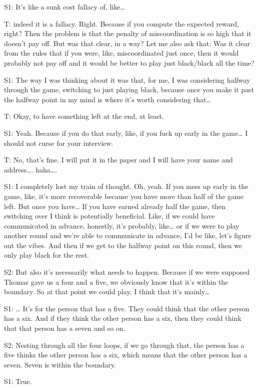 \documentclass[a4paper,superscriptaddress,nofootinbib]{revtex4}
\begin{document}
S1: It's like a sunk cost fallacy of, like… 

T: indeed it is a fallacy. Right. Because if you compute the expected reward, right? Then the problem is that the penalty of miscoordination is so high that it doesn't pay off. But was that clear, in a way? Let me also ask that: Was it clear from the rules that if you were, like, miscoordinated just once, then it would probably not pay off and it would be better to play just black/black all the time? 

S1: The way I was thinking about it was that, for me, I was considering halfway through the game, switching to just playing black, because once you make it past the halfway point in my mind is where it's worth considering that…

T: Okay, to have something left at the end, at least. 

S1: Yeah. Because if you do that early, like, if you fuck up early in the game… I should not curse for your interview.

T: No, that's fine. I will put it in the paper and I will have your name and address…. haha…. 

S1: I completely lost my train of thought. Oh, yeah. If you mess up early in the game, like, it's more recoverable because you have more than half of the game left. But once you have… If you have earned already half the game, then switching over I think is potentially beneficial. Like, if we could have communicated in advance, honestly, it's probably, like… or if we were to play another round and we're able to communicate in advance, I'd be like, let's figure out the vibes. And then if we get to the halfway point on this round, then we only play black for the rest.

S2: But also it's necessarily what needs to happen. Because if we were supposed Thomas gave us a four and a five, we obviously know that it's within the boundary. So at that point we could play. I think that it’s mainly…

S1: … It’s for the person that has a five. They could think that the other person has a six. And if they think the other person has a six, then they could think that that person has a seven and so on. 

S2: Nesting through all the four loops, if we go through that, the person has a five thinks the other person has a six, which means that the other person has a seven. Seven is within the boundary. 

S1: True. 
\end{document}
